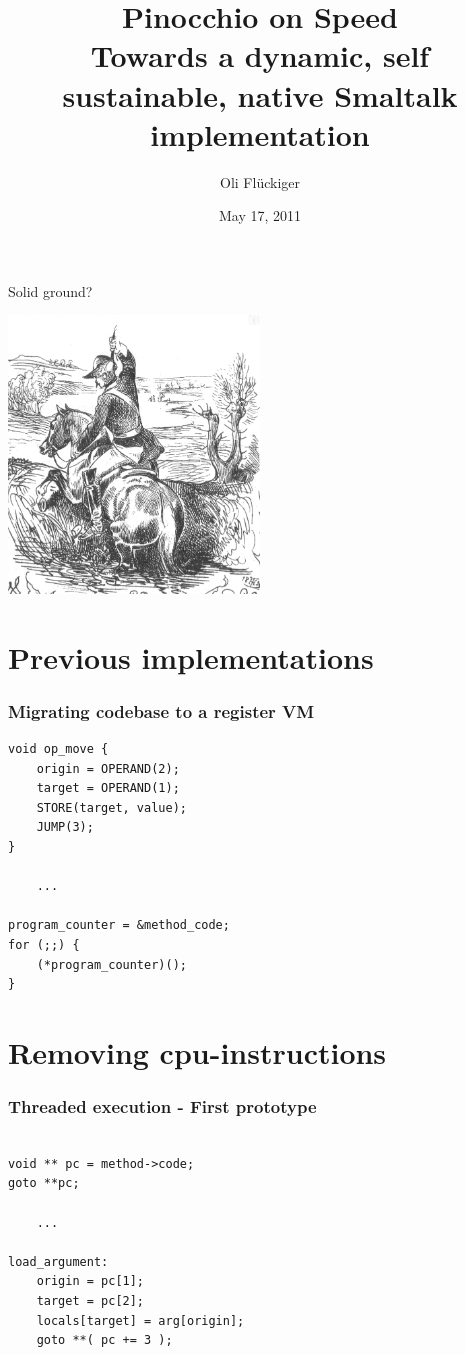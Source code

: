\documentclass{beamer}
\title[Pinocchio on Speed]{Pinocchio on Speed \\ Towards a dynamic, self sustainable, native Smaltalk implementation}
\author{Oli Flückiger}
\institute{scg.unibe.ch}
\date{May 17, 2011}
\begin{document}
\begin{frame}
\titlepage
\end{frame}


\begin{frame}{Solid ground?}
     \begin{center}\includegraphics[width=0.5\textwidth]{muenchhausen.png}\end{center}
\end{frame}

\section{Previous implementations}

\begin{frame}[fragile]
    \frametitle{Migrating codebase to a register VM}
    \begin{lstlisting}
void op_move {
    origin = OPERAND(2);
    target = OPERAND(1);
    STORE(target, value);
    JUMP(3);
}

    ...

program_counter = &method_code;
for (;;) {
    (*program_counter)();
}
    \end{lstlisting}
\end{frame}

\section{Removing cpu-instructions}

\begin{frame}[fragile]
    \frametitle{Threaded execution - First prototype}
    \begin{lstlisting}

void ** pc = method->code;
goto **pc;
            
    ...

load_argument:
    origin = pc[1];
    target = pc[2];
    locals[target] = arg[origin];
    goto **( pc += 3 );

    \end{lstlisting}
\end{frame}
\end{document}
